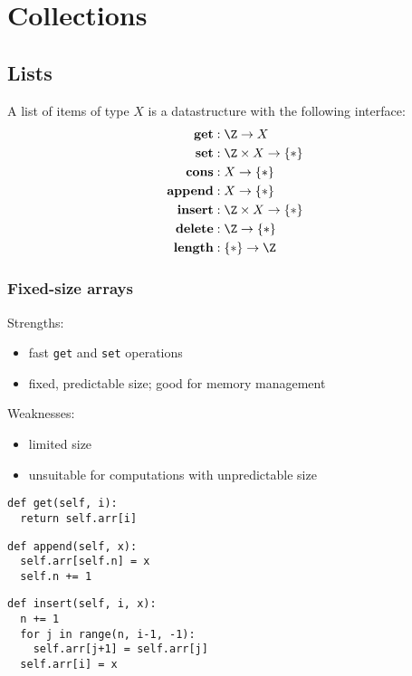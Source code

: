 \documentclass{article}
\begin{document}
\section{Collections}

\subsection{Lists}

\begin{definition}
	A list of items of type $X$ is a datastructure with the
	following interface:
	\begin{align*}
		\textbf{get}    & : \Z \to X             \\
		\textbf{set}    & : \Z\times X\to\{*\}   \\
		\textbf{cons}   & : X\to \{*\}           \\
		\textbf{append} & : X\to \{*\}           \\
		\textbf{insert} & : \Z\times X \to \{*\} \\
		\textbf{delete} & : \Z\to \{*\}          \\
		\textbf{length} & : \{*\} \to \Z
	\end{align*}
\end{definition}

\subsubsection{Fixed-size arrays}
\begin{multicols}{2}
	\noindent Strengths:
	\begin{itemize}
		\item fast \texttt{get} and \texttt{set} operations
		\item fixed, predictable size; good for memory management
	\end{itemize}

	\noindent Weaknesses:
	\begin{itemize}
		\item limited size
		\item unsuitable for computations with unpredictable size
	\end{itemize}

	\begin{verbatim}
def get(self, i):
  return self.arr[i]
\end{verbatim}

	\begin{verbatim}
def append(self, x):
  self.arr[self.n] = x
  self.n += 1
\end{verbatim}

	\begin{verbatim}
def insert(self, i, x):
  n += 1
  for j in range(n, i-1, -1):
    self.arr[j+1] = self.arr[j]
  self.arr[i] = x
\end{verbatim}
\end{multicols}
\end{document}
